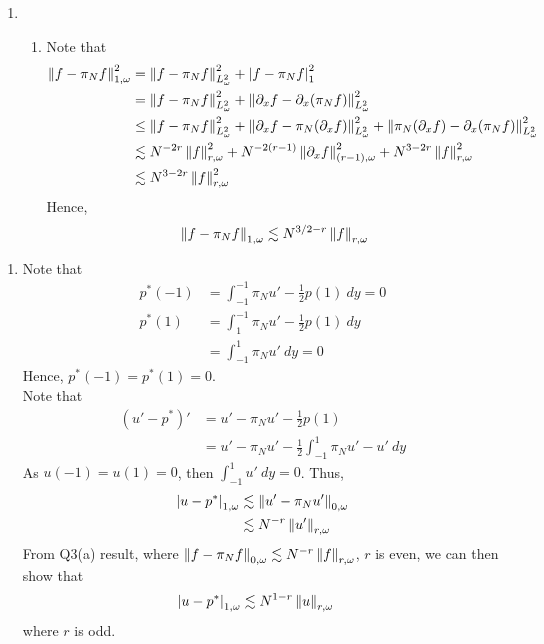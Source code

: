 \documentclass[a4paper,8pt]{article}
\begin{document}
\newpage
\begin{enumerate}[label=Q\arabic	*.]
\setlength{\itemsep}{0pt}
\setcounter{enumi}{2}
\item 
\begin{enumerate}[label=(\alph*)]
\setlength{\itemsep}{0pt}
\setcounter{enumii}{3}
\item Note that
\begin{align}
\left\lVert f - \pi_N f\right\rVert^2_{1, \omega} &= \left\lVert f - \pi_N f\right\rVert^2_{L^2_{\omega}} + \left\lvert f - \pi_N f\right\rvert^2_1 \nonumber \\
&= \left\lVert f - \pi_N f\right\rVert^2_{L^2_{\omega}} + \left\lVert\partial_x f - \partial_x (\pi_N f)\right\rVert^2_{L^2_{\omega}} \nonumber \\
&\leq \left\lVert f - \pi_N f\right\rVert^2_{L^2_{\omega}} + \left\lVert\partial_x f - \pi_N (\partial_x f)\right\rVert^2_{L^2_{\omega}} +  \left\lVert\pi_N (\partial_x f) - \partial_x (\pi_N f)\right\rVert^2_{L^2_{\omega}} \nonumber \\
&\lesssim N^{-2r} \left\lVert f\right\rVert^2_{r, \omega} + N^{-2(r-1)}\left\lVert\partial_x f\right\rVert^2_{(r-1), \omega} + N^{3-2r} \left\lVert f\right\rVert^2_{r, \omega} \nonumber \\
&\lesssim N^{3-2r} \left\lVert f\right\rVert^2_{r, \omega} \nonumber
\end{align}
Hence,
\begin{equation}
\left\lVert f - \pi_N f\right\rVert_{1, \omega} \lesssim N^{3/2-r} \left\lVert f\right\rVert_{r, \omega} \nonumber
\end{equation}
\end{enumerate}
\end{enumerate}

\newpage
\begin{enumerate}[label=Q\arabic	*.]
\setlength{\itemsep}{0pt}
\setcounter{enumi}{3}
\item Note that
\begin{align}
p^{*}(-1) &= \int_{-1}^{-1} \pi_N u' - \frac{1}{2} p(1)\ dy = 0 \nonumber \\
p^{*}(1) &= \int_{1}^{-1} \pi_N u' - \frac{1}{2} p(1) \ dy \nonumber \\
&= \int_{-1}^{1} \pi_N u' \ dy = 0 \nonumber 
\end{align}
Hence, $p^{*}(-1) = p^{*}(1) = 0$.\\
Note that
\begin{align}
(u' - p^{*})' &= u' - \pi_N u' - \frac{1}{2} p(1) \nonumber \\
&= u' - \pi_N u' - \frac{1}{2} \int_{-1}^{1} \pi_N u' - u' \ dy \nonumber
\end{align}
As $u(-1) = u(1) = 0$, then $\int_{-1}^{1} u' \ dy = 0$. Thus,
\begin{align}
\left\lvert u-p^{*}\right\rvert_{1, \omega} &\lesssim \left\lVert u' - \pi_N u'\right\rVert_{0, \omega} \nonumber \\
&\lesssim N^{-r} \left\lVert u'\right\rVert_{r, \omega} \nonumber
\end{align}
From Q3(a) result, where $\left\lVert f - \pi_N f\right\rVert_{0, \omega} \lesssim N^{-r} \left\lVert f\right\rVert_{r,\omega}$, $r$ is even, we can then show that
\begin{align}
\left\lvert u-p^{*}\right\rvert_{1, \omega} &\lesssim N^{1-r} \left\lVert u\right\rVert_{r, \omega} \nonumber
\end{align}
where $r$ is odd.
\end{enumerate}
\end{document}
